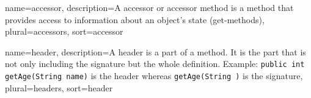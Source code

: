 {
	name=accessor,
	description={A accessor or accessor method is a method that provides
		access to information about an object's state (get-methods)},
	plural=accessors,
	sort=accessor
}

{
	name=header,
	description={A header is a part of a method. It is the part that is
		not only including the signature but the whole definition.
		Example: \lstinline{public int getAge(String name)} is the
		header whereas \lstinline{getAge(String )} is the signature},
	plural=headers,
	sort=header
}
